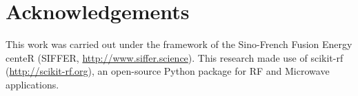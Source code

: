 \documentclass[12p]{iopart}
\begin{document}
\section*{Acknowledgements}

This work was carried out under the framework of the Sino-French Fusion Energy centeR (SIFFER, \url{http://www.siffer.science}). This research made use of scikit-rf (\url{http://scikit-rf.org}), an open-source Python package for RF and Microwave applications.



\printbibliography
\end{document}
